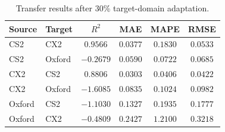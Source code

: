 \begin{table}[H]
\TableStyle
\caption{Transfer results after 30\% target-domain adaptation.}
\label{tab:4-8}
\begin{tabularx}{\linewidth}{@{\extracolsep{\fill}}L{0.90}L{0.90}C{1.20}C{1.00}C{1.00}C{1.00}@{}}
\toprule
Source & Target & $R^2$ & MAE & MAPE & RMSE \\
\midrule
CS2 & CX2 & $0.9566$ & $0.0377$ & $0.1830$ & $0.0533$ \\
CS2 & Oxford & $-0.2679$ & $0.0590$ & $0.0722$ & $0.0685$ \\
CX2 & CS2 & $0.8806$ & $0.0303$ & $0.0406$ & $0.0422$ \\
CX2 & Oxford & $-1.6085$ & $0.0835$ & $0.1024$ & $0.0982$ \\
Oxford & CS2 & $-1.1030$ & $0.1327$ & $0.1935$ & $0.1777$ \\
Oxford & CX2 & $-0.4809$ & $0.2427$ & $1.2100$ & $0.3218$ \\
\bottomrule
\end{tabularx}
\end{table}
